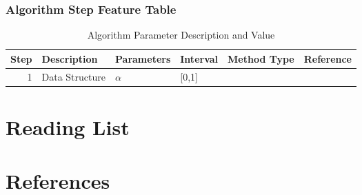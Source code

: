 \documentclass[preprint, 9pt,times]{elsarticle}
\theoremstyle{definition}
\begin{document}
\subsubsection{Algorithm Step Feature Table}

\begin{table}[H]\footnotesize
	\caption{Algorithm Parameter Description and Value}
	\begin{tabular}{rlllp{1.25cm}l}
		\hline	
		Step & Description & Parameters & Interval & Method Type & Reference \\
		\hline 
		1 & Data Structure & $\alpha$ & [0,1] & \cite{key1}\\
		\hline
	\end{tabular}
\end{table}




\section{Reading List}

\section{References}
\end{document}
